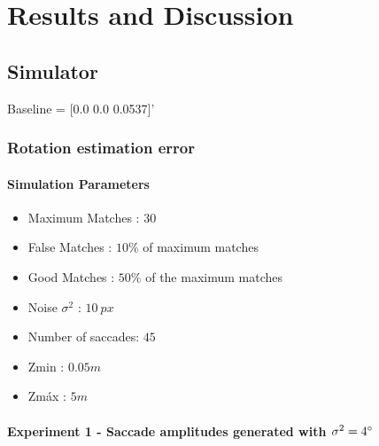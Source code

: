 
\chapter{Results and Discussion}
\label{cha4:results}
\section{Simulator}
Baseline = [0.0 0.0 0.0537]'
\subsection{Rotation estimation error}
\subsubsection{Simulation Parameters}
\begin{itemize}
	\item Maximum Matches : $30$
	\item False Matches : $10 \%$ of maximum matches
	\item Good Matches : $50 \%$ of the maximum matches
	\item Noise $\sigma^2$ : $10 \ px$
	\item Number of saccades: $45$
	\item Zmin : $0.05 m$
	\item Zmáx : $5 m$
\end{itemize}
\subsubsection{Experiment 1 - Saccade amplitudes generated with $\sigma^2 = 4 \degree $}

